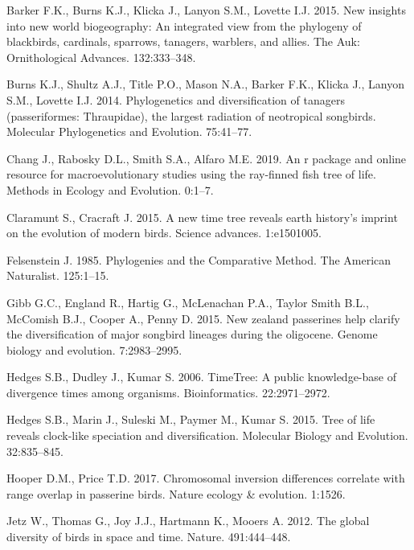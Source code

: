 \documentclass[]{article}
\begin{document}
\leavevmode\hypertarget{ref-barker2015new}{}%
Barker F.K., Burns K.J., Klicka J., Lanyon S.M., Lovette I.J. 2015. New insights into new world biogeography: An integrated view from the phylogeny of blackbirds, cardinals, sparrows, tanagers, warblers, and allies. The Auk: Ornithological Advances. 132:333--348.

\leavevmode\hypertarget{ref-burns2014phylogenetics}{}%
Burns K.J., Shultz A.J., Title P.O., Mason N.A., Barker F.K., Klicka J., Lanyon S.M., Lovette I.J. 2014. Phylogenetics and diversification of tanagers (passeriformes: Thraupidae), the largest radiation of neotropical songbirds. Molecular Phylogenetics and Evolution. 75:41--77.

\leavevmode\hypertarget{ref-chang2019r}{}%
Chang J., Rabosky D.L., Smith S.A., Alfaro M.E. 2019. An r package and online resource for macroevolutionary studies using the ray-finned fish tree of life. Methods in Ecology and Evolution. 0:1--7.

\leavevmode\hypertarget{ref-claramunt2015new}{}%
Claramunt S., Cracraft J. 2015. A new time tree reveals earth history's imprint on the evolution of modern birds. Science advances. 1:e1501005.

\leavevmode\hypertarget{ref-Felsenstein1985a}{}%
Felsenstein J. 1985. Phylogenies and the Comparative Method. The American Naturalist. 125:1--15.

\leavevmode\hypertarget{ref-gibb2015new}{}%
Gibb G.C., England R., Hartig G., McLenachan P.A., Taylor Smith B.L., McComish B.J., Cooper A., Penny D. 2015. New zealand passerines help clarify the diversification of major songbird lineages during the oligocene. Genome biology and evolution. 7:2983--2995.

\leavevmode\hypertarget{ref-Hedges2006}{}%
Hedges S.B., Dudley J., Kumar S. 2006. TimeTree: A public knowledge-base of divergence times among organisms. Bioinformatics. 22:2971--2972.

\leavevmode\hypertarget{ref-Hedges2015}{}%
Hedges S.B., Marin J., Suleski M., Paymer M., Kumar S. 2015. Tree of life reveals clock-like speciation and diversification. Molecular Biology and Evolution. 32:835--845.

\leavevmode\hypertarget{ref-hooper2017chromosomal}{}%
Hooper D.M., Price T.D. 2017. Chromosomal inversion differences correlate with range overlap in passerine birds. Nature ecology \& evolution. 1:1526.

\leavevmode\hypertarget{ref-Jetz2012}{}%
Jetz W., Thomas G., Joy J.J., Hartmann K., Mooers A. 2012. The global diversity of birds in space and time. Nature. 491:444--448.
\end{document}
